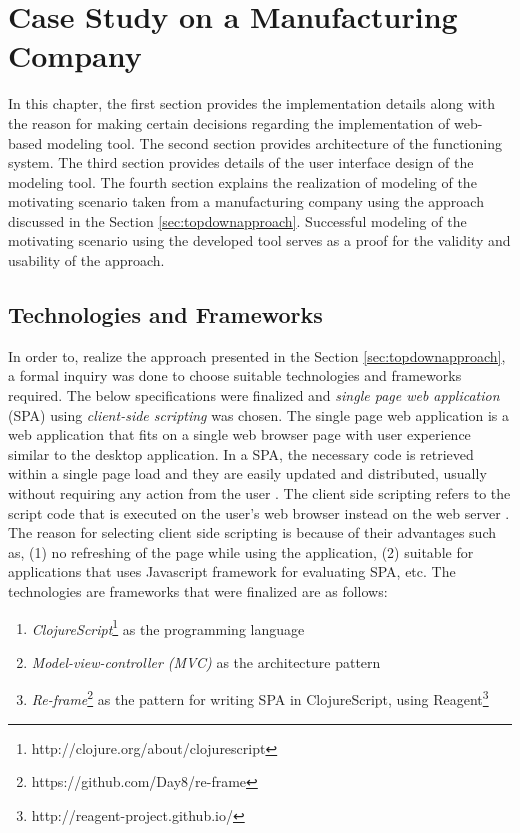 \chapter{Case Study on a Manufacturing Company}
\label{chap:casestudy}

In this chapter, the first section provides the implementation details along with the reason for making certain decisions regarding the implementation of web-based modeling tool. The second section provides architecture of the functioning system. The third section provides details of the user interface design of the modeling tool. The fourth section explains the realization of modeling of the motivating scenario taken from a manufacturing company using the approach discussed in the Section \ref{sec:topdownapproach}. Successful modeling of the motivating scenario using the developed tool serves as a proof for the validity and usability of the approach. 

\section{Technologies and Frameworks}
\label{subsec:specifications}
In order to, realize the approach presented in the Section \ref{sec:topdownapproach}, a formal inquiry was done to choose suitable technologies and frameworks required. The below specifications were finalized and \textit{single page web application} (SPA) using \textit{client-side scripting} was chosen. The single page web application is a web application that fits on a single web browser page with user experience similar to the desktop application. In a SPA, the necessary code is retrieved within a single page load and they are easily updated and distributed, usually without requiring any action from the user \cite{Mikowski2013}. The client side scripting refers to the script code that is executed on the user's web browser instead on the web server \cite{Sierra2012}. The reason for selecting client side scripting is because of their advantages such as, (1) no refreshing of the page while using the application, (2) suitable for applications that uses Javascript framework for evaluating SPA, etc. The technologies are frameworks that were finalized are as follows:

\begin{enumerate}   
	\item \textit{ClojureScript}\footnote{http://clojure.org/about/clojurescript} as the programming language
	\item \textit{Model-view-controller (MVC)} \cite{Deacon2009}  as the architecture pattern
	\item \textit{Re-frame}\footnote{https://github.com/Day8/re-frame} as the pattern for writing SPA in ClojureScript, using Reagent\footnote{http://reagent-project.github.io/}	
\end{enumerate}

